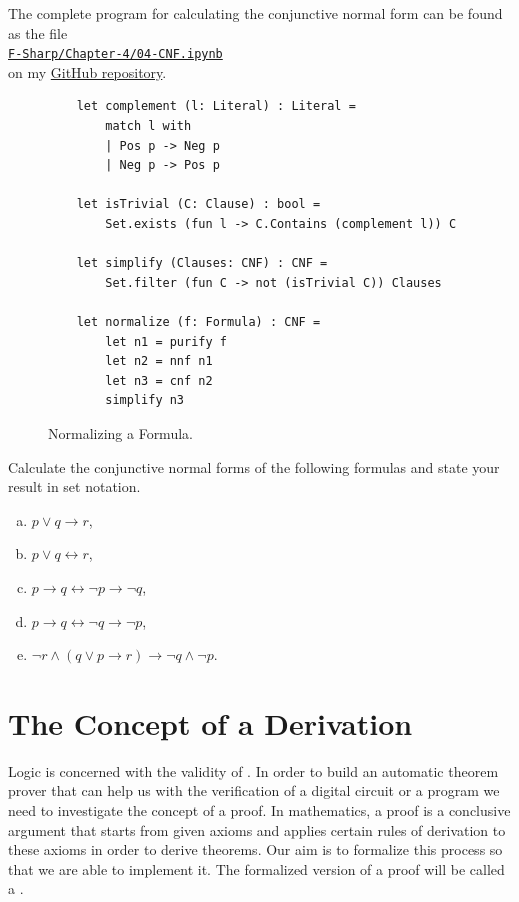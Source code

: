 The complete program for calculating the conjunctive normal form can be found as the file
\\[0.2cm]
\hspace*{1.3cm}
\href{https://github.com/karlstroetmann/Logic/blob/master/F-Sharp/Chapter-4/04-CNF.ipynb}{\texttt{F-Sharp/Chapter-4/04-CNF.ipynb}} 
\\[0.2cm]
on my \href{https://github.com/karlstroetmann/Logic}{GitHub repository}.


\begin{figure}[!ht]
  \centering
\begin{verbatim}
    let complement (l: Literal) : Literal =
        match l with
        | Pos p -> Neg p
        | Neg p -> Pos p

    let isTrivial (C: Clause) : bool =
        Set.exists (fun l -> C.Contains (complement l)) C

    let simplify (Clauses: CNF) : CNF =
        Set.filter (fun C -> not (isTrivial C)) Clauses

    let normalize (f: Formula) : CNF =
        let n1 = purify f
        let n2 = nnf n1
        let n3 = cnf n2
        simplify n3
\end{verbatim} 
\vspace*{-0.3cm}
  \caption{Normalizing a Formula.}
  \label{fig:normalize}
\end{figure}
\pagebreak

\exerciseEng
Calculate the conjunctive normal forms of the following formulas and state your result in set notation.
\begin{enumerate}[(a)]
\item $p \vee q \rightarrow r$,
\item $p \vee q \leftrightarrow r$,
\item $p \rightarrow q \leftrightarrow \neg p \rightarrow \neg q$,
\item $p \rightarrow q \leftrightarrow \neg q \rightarrow \neg p$,
\item $\neg r \wedge (q \vee p \rightarrow r) \rightarrow \neg q \wedge \neg p$.
\end{enumerate}

\section{The Concept of a Derivation}
Logic is concerned with the validity of . In order to build an automatic theorem prover that can 
help us with the verification of a digital circuit or a program we need to investigate the concept of a proof.
In mathematics, a proof is a conclusive argument that starts from given axioms and applies certain rules of
derivation to these axioms in order to derive theorems.  Our aim is to formalize this process so that we are
able to implement it. The formalized version of a proof will be called a .


